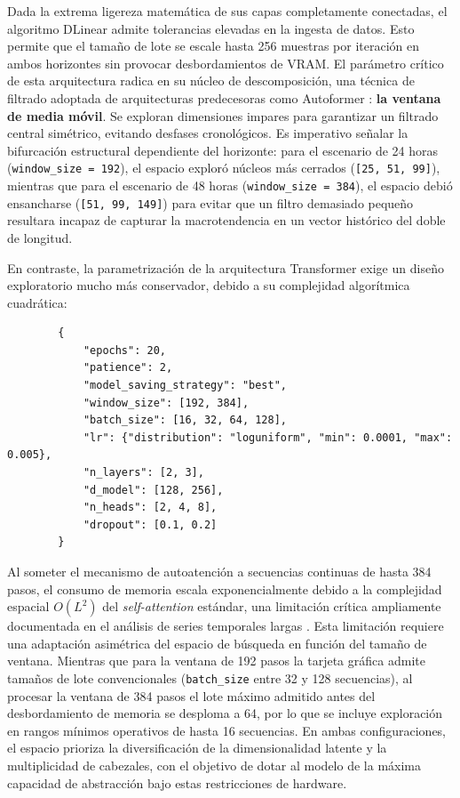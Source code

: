 Dada la extrema ligereza matemática de sus capas completamente conectadas, el algoritmo DLinear admite tolerancias elevadas en la ingesta de datos. Esto permite que el tamaño de lote se escale hasta 256 muestras por iteración en ambos horizontes sin provocar desbordamientos de VRAM. El parámetro crítico de esta arquitectura radica en su núcleo de descomposición, una técnica de filtrado adoptada de arquitecturas predecesoras como Autoformer \parencite{wu2021autoformer}: \textbf{la ventana de media móvil}. Se exploran dimensiones impares para garantizar un filtrado central simétrico, evitando desfases cronológicos. Es imperativo señalar la bifurcación estructural dependiente del horizonte: para el escenario de 24 horas (\texttt{window\_size = 192}), el espacio exploró núcleos más cerrados (\texttt{[25, 51, 99]}), mientras que para el escenario de 48 horas (\texttt{window\_size = 384}), el espacio debió ensancharse (\texttt{[51, 99, 149]}) para evitar que un filtro demasiado pequeño resultara incapaz de capturar la macrotendencia en un vector histórico del doble de longitud.

En contraste, la parametrización de la arquitectura Transformer exige un diseño exploratorio mucho más conservador, debido a su complejidad algorítmica cuadrática:

\begin{listing}[H]
	\caption{Espacio de búsqueda y configuración base para la arquitectura Transformer.}
	\label{lst:json_transformer}
	\begin{verbatim}
		{
			"epochs": 20,
			"patience": 2,
			"model_saving_strategy": "best",
			"window_size": [192, 384],
			"batch_size": [16, 32, 64, 128],
			"lr": {"distribution": "loguniform", "min": 0.0001, "max": 0.005},
			"n_layers": [2, 3],
			"d_model": [128, 256],
			"n_heads": [2, 4, 8],
			"dropout": [0.1, 0.2]
		}
	\end{verbatim}
\end{listing}

Al someter el mecanismo de autoatención a secuencias continuas de hasta 384 pasos, el consumo de memoria escala exponencialmente debido a la complejidad espacial $O(L^2)$ del \textit{self-attention} estándar, una limitación crítica ampliamente documentada en el análisis de series temporales largas \parencite{zhou2021informer}. Esta limitación requiere una adaptación asimétrica del espacio de búsqueda en función del tamaño de ventana. Mientras que para la ventana de 192 pasos la tarjeta gráfica admite tamaños de lote convencionales (\texttt{batch\_size} entre 32 y 128 secuencias), al procesar la ventana de 384 pasos el lote máximo admitido antes del desbordamiento de memoria se desploma a 64, por lo que se incluye exploración en rangos mínimos operativos de hasta 16 secuencias. En ambas configuraciones, el espacio prioriza la diversificación de la dimensionalidad latente y la multiplicidad de cabezales, con el objetivo de dotar al modelo de la máxima capacidad de abstracción bajo estas restricciones de hardware.

